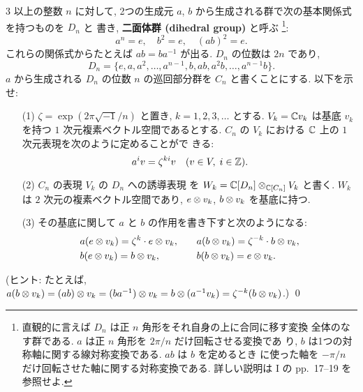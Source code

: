 \documentclass[12pt,twoside]{jarticle}
\begin{document}
\begin{question}[巡回群から二面体群への誘導表現]
\label{q:ind-dihed}
  $3$ 以上の整数 $n$ に対して, 
  2つの生成元 $a$, $b$ から生成される群で次の基本関係式を持つものを $D_n$ と
  書き, {\bf 二面体群 (dihedral group)} と呼ぶ%
  \footnote{直観的に言えば $D_n$ は正 $n$ 角形をそれ自身の上に合同に移す変換
    全体のなす群である.  $a$ は正 $n$ 角形を $2\pi/n$ だけ回転させる変換であ
    り, $b$ は1つの対称軸に関する線対称変換である. $ab$ は $b$ を定めるとき
    に使った軸を $-\pi/n$ だけ回転させた軸に関する対称変換である.
    詳しい説明は \cite{hirai} I の pp.~17--19 を参照せよ.}:
  \begin{equation*}
    a^n = e, \quad b^2 = e, \quad (ab)^2 = e.
  \end{equation*}
  これらの関係式からたとえば $ab=ba^{-1}$ が出る.
  $D_n$ の位数は $2n$ であり,
  \begin{equation*}
    D_n = \{ e, a, a^2, \ldots, a^{n-1}, b, ab, a^2b, \ldots, a^{n-1}b\}.
  \end{equation*}
  $a$ から生成される $D_n$ の位数 $n$ の巡回部分群を $C_n$ と書くことにする.
  以下を示せ:
  \begin{itemize}
  \item[(1)] $\zeta = \exp(2\pi\sqrt{-1}/n)$ と置き, $k=1,2,3,\ldots$ とする.  
    $V_k={\mathbb C} v_k$ は基底 $v_k$ を持つ $1$ 次元複素ベクトル空間であるとする.
    $C_n$ の $V_k$ における ${\mathbb C}$ 上の $1$ 次元表現を次のように定めることがで
    きる:
    \begin{equation*}
      a^i v = \zeta^{ki} v
      \quad (v\in V,\; i\in{\mathbb Z}).
    \end{equation*}
  \item[(2)] $C_n$ の表現 $V_k$ の $D_n$ への誘導表現
    を $W_k={\mathbb C}[D_n]\otimes_{{\mathbb C}[C_n]}V_k$ と書く.
    $W_k$ は $2$ 次元の複素ベクトル空間であり, 
    $e\otimes v_k$, $b\otimes v_k$ を基底に持つ.
  \item[(3)] その基底に関して $a$ と $b$ の作用を書き下すと次のようになる:
    \begin{alignat*}{2}
      &
      a(e\otimes v_k) = \zeta^k \cdot e\otimes v_k,
      & \quad &
      a(b\otimes v_k) = \zeta^{-k}\cdot b\otimes v_k,
      \\ &
      b(e\otimes v_k) = b\otimes v_k,
      & \quad &
      b(b\otimes v_k) = e\otimes v_k.
    \end{alignat*}
  \end{itemize}
  (ヒント: たとえば, $a(b\otimes v_k) = (ab)\otimes v_k = (ba^{-1})\otimes v_k 
  = b\otimes(a^{-1}v_k) = \zeta^{-k} (b\otimes v_k)$.)
  \qed
\end{question}
\end{document}
